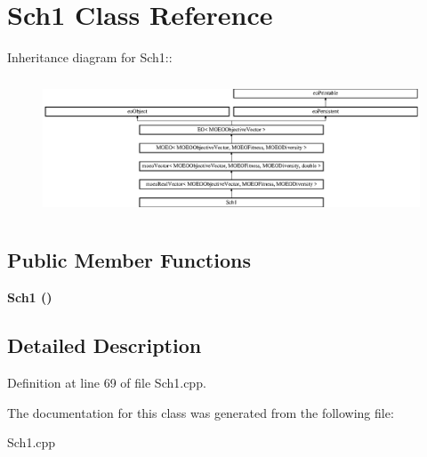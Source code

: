 \section{Sch1 Class Reference}
\label{classSch1}
Inheritance diagram for Sch1::\begin{figure}[H]
\begin{center}
\leavevmode
\includegraphics[height=4.11765cm]{classSch1}
\end{center}
\end{figure}
\subsection*{Public Member Functions}
\begin{CompactItemize}
\item 
\bf{Sch1} ()\label{classSch1_3ddc72f40539bfe0d5bb8d977b6655c0}

\end{CompactItemize}


\subsection{Detailed Description}




Definition at line 69 of file Sch1.cpp.

The documentation for this class was generated from the following file:\begin{CompactItemize}
\item 
Sch1.cpp\end{CompactItemize}
